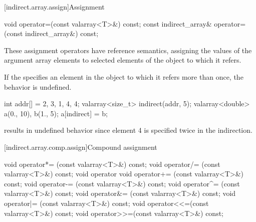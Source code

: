 [indirect.array.assign]{Assignment}

%
\begin{itemdecl}
void operator=(const valarray<T>&) const;
const indirect_array& operator=(const indirect_array&) const;
\end{itemdecl}

\begin{itemdescr}
\pnum
These assignment operators have reference semantics, assigning the values
of the argument array elements to selected elements of the
object to which it refers.

\pnum
If the
specifies an element in the
object to which it refers more than once, the behavior is undefined.
%

\pnum
\begin{example}
\begin{codeblock}
int addr[] = {2, 3, 1, 4, 4};
valarray<size_t> indirect(addr, 5);
valarray<double> a(0., 10), b(1., 5);
a[indirect] = b;
\end{codeblock}
results in undefined behavior since element 4 is specified twice in the
indirection.
\end{example}
\end{itemdescr}

[indirect.array.comp.assign]{Compound assignment}

%
%
%
%
%
%
%
%
%
%
\begin{itemdecl}
void operator*= (const valarray<T>&) const;
void operator/= (const valarray<T>&) const;
void operator%
void operator+= (const valarray<T>&) const;
void operator-= (const valarray<T>&) const;
void operator^= (const valarray<T>&) const;
void operator&= (const valarray<T>&) const;
void operator|= (const valarray<T>&) const;
void operator<<=(const valarray<T>&) const;
void operator>>=(const valarray<T>&) const;
\end{itemdecl}

